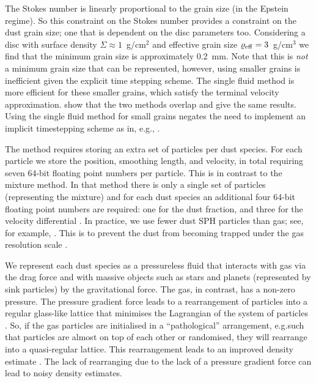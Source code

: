 \documentclass[fleqn,usenatbib]{mnras}
\begin{document}
The Stokes number is linearly proportional to the grain size (in the Epstein
regime). So this constraint on the Stokes number provides a constraint on the
dust grain size; one that is dependent on the disc parameters too. Considering a
disc with surface density \(\Sigma \approx 1\)~g/cm\({}^2\) and effective grain
size \(\varrho_{\rm eff} = 3\)~g/cm\({}^3\) we find that the minimum grain size
is approximately 0.2~mm. Note that this is \emph{not} a minimum grain size that
can be represented, however, using smaller grains is inefficient given the
explicit time stepping scheme. The single fluid method is more efficient for
these smaller grains, which satisfy the terminal velocity approximation.
\citet{Cuello2019MNRAS.483.4114C} show that the two methods overlap and give the
same results. Using the single fluid method for small grains negates the need to
implement an implicit timestepping scheme as in, e.g.,
\citet{Loren-Aguilar2014MNRAS.443..927L, Loren-Aguilar2015MNRAS.454.4114L}.

The method requires storing an extra set of particles per dust species. For each
particle we store the position, smoothing length, and velocity, in total
requiring seven 64-bit floating point numbers per particle. This is in contrast
to the mixture method. In that method there is only a single set of particles
(representing the mixture) and for each dust species an additional four 64-bit
floating point numbers are required: one for the dust fraction, and three for
the velocity differential \citep{Hutchison2018MNRAS.476.2186H}. In practice, we
use fewer dust SPH particles than gas; see, for example,
\citet{Dipierro2015MNRAS.453L..73D, Mentiplay2019MNRAS.484L.130M,
Calcino2019MNRAS.490.2579C}. This is to prevent the dust from becoming trapped
under the gas resolution scale \citep{Laibe2012MNRAS.420.2345L}.

We represent each dust species as a pressureless fluid that interacts with gas
via the drag force and with massive objects such as stars and planets
(represented by sink particles) by the gravitational force. The gas, in
contrast, has a non-zero pressure. The pressure gradient force leads to a
rearrangement of particles into a regular glass-like lattice
\citep{Monaghan2005RPPh...68.1703M} that minimises the Lagrangian of the system
of particles \citep{Price2012JCoPh.231..759P}. So, if the gas particles are
initialised in a ``pathological'' arrangement, e.g.\@ such that particles are
almost on top of each other or randomised, they will rearrange into a
quasi-regular lattice. This rearrangement leads to an improved density estimate
\citep{Price2012JCoPh.231..759P}. The lack of rearranging due to the lack of a
pressure gradient force can lead to noisy density estimates.
\end{document}
